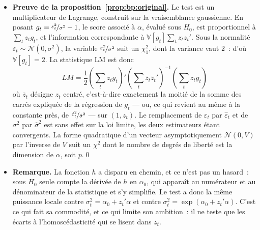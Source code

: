 \documentclass[10pt,a4paper]{article}
\newcommand{\normal}[2]{\mathcal N\left(#1,#2\right)}
\theoremstyle{definition}
\renewcommand{\newline}{\unskip\par\vspace{1.5pt}}
\begin{document}
\begin{notes}

  \begin{itemize}

  \item \textbf{Preuve de la proposition~\ref{prop:bp:original}.} Le test est un
    multiplicateur de Lagrange, construit sur la vraisemblance gaussienne. En
    posant $g_t = \nicefrac{\varepsilon_t^2}{\sigma^2} - 1$, le score associé
    à $\alpha$, évalué sous $H_0$, est proportionnel à $\sum_t z_t g_t$, et
    l'information correspondante à $\mathbb V[g_t]\sum_t z_tz_t'$. Sous la
    normalité $\varepsilon_t\sim\normal{0}{\sigma^2}$, la variable
    $\nicefrac{\varepsilon_t^2}{\sigma^2}$ suit un $\chi^2_1$, dont la variance
    vaut $2$~: d'où $\mathbb V[g_t]=2$. La statistique LM est donc
    \[
      LM = \frac{1}{2}\left(\sum_t z_tg_t\right)'
      \left(\sum_t \bar z_t\bar z_t'\right)^{-1}\left(\sum_t z_tg_t\right)
    \]
    où $\bar z_t$ désigne $z_t$ centré, c'est-à-dire exactement la moitié de la
    somme des carrés expliquée de la régression de $g_t$ — ou, ce qui revient au
    même à la constante près, de $\nicefrac{\hat\varepsilon_t^2}{\hat\sigma^2}$
    — sur $(1,z_t)$. Le remplacement de $\varepsilon_t$ par $\hat\varepsilon_t$
    et de $\sigma^2$ par $\hat\sigma^2$ est sans effet sur la loi limite, les
    deux estimateurs étant convergents. La forme quadratique d'un vecteur
    asymptotiquement $\normal{0}{V}$ par l'inverse de $V$ suit un $\chi^2$ dont
    le nombre de degrés de liberté est la dimension de $\alpha$, soit $p$.\qed\newline

  \item \textbf{Remarque.} La fonction $h$ a disparu en chemin, et ce n'est pas
    un hasard~: sous $H_0$ seule compte la dérivée de $h$ en $\alpha_0$, qui
    apparaît au numérateur et au dénominateur de la statistique et s'y simplifie.
    Le test a donc la même puissance locale contre $\sigma_t^2 = \alpha_0 +
    z_t'\alpha$ et contre $\sigma_t^2 = \exp(\alpha_0 + z_t'\alpha)$. C'est ce
    qui fait sa commodité, et ce qui limite son ambition~: il ne teste que les
    écarts à l'homoscédasticité qui se lisent dans $z_t$.

  \end{itemize}

\end{notes}
\end{document}
